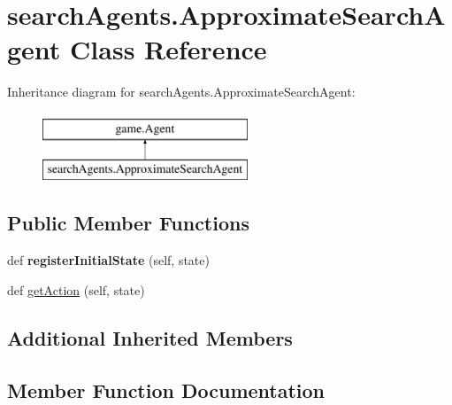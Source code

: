\hypertarget{classsearch_agents_1_1_approximate_search_agent}{}\section{search\+Agents.\+Approximate\+Search\+Agent Class Reference}
\label{classsearch_agents_1_1_approximate_search_agent}
Inheritance diagram for search\+Agents.\+Approximate\+Search\+Agent\+:\begin{figure}[H]
\begin{center}
\leavevmode
\includegraphics[height=2.000000cm]{classsearch_agents_1_1_approximate_search_agent}
\end{center}
\end{figure}
\subsection*{Public Member Functions}
\begin{DoxyCompactItemize}
\item 
\mbox{\label{classsearch_agents_1_1_approximate_search_agent_ae8e395ee22a257e095c2b2d111670af3}} 
def {\bfseries register\+Initial\+State} (self, state)
\item 
def \hyperlink{classsearch_agents_1_1_approximate_search_agent_aade25c210785670dba8ee1e9a057f936}{get\+Action} (self, state)
\end{DoxyCompactItemize}
\subsection*{Additional Inherited Members}


\subsection{Member Function Documentation}
\mbox{\label{classsearch_agents_1_1_approximate_search_agent_aade25c210785670dba8ee1e9a057f936}} 
